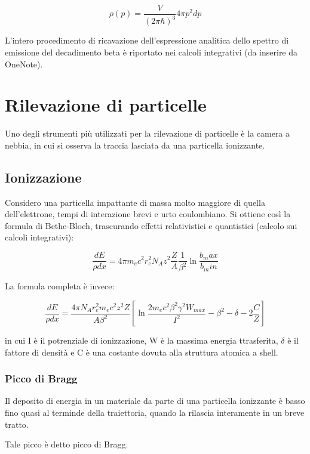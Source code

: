 \documentclass{article}
\begin{document}
\begin{equation}
    \rho(p)=\frac{V}{(2\pi\hbar)^3}4\pi p^2dp
\end{equation}

L'intero procedimento di ricavazione dell'espressione analitica dello spettro di emissione del decadimento beta è riportato nei calcoli integrativi (da inserire da OneNote).

\section{Rilevazione di particelle}
Uno degli strumenti più utilizzati per la rilevazione di particelle è la camera a nebbia, in cui si osserva la traccia lasciata da una particella ionizzante.

\subsection{Ionizzazione}
Considero una particella impattante di massa molto maggiore di quella dell'elettrone, tempi di interazione brevi e urto coulombiano.
Si ottiene così la formula di Bethe-Bloch, trascurando effetti relativistici e quantistici (calcolo sui calcoli integrativi):

\begin{equation}
    \frac{dE}{\rho dx}=4\pi m_ec^2r_e^2N_Az^2\frac{Z}{A}\frac{1}{\beta^2}\ln{\frac{b_max}{b_min}}
\end{equation}

La formula completa è invece:

\begin{equation}
    \frac{dE}{\rho dx}=\frac{4\pi N_Ar_e^2m_ec^2z^2Z}{A\beta^2}\left[\ln{\frac{2m_ec^2\beta^2\gamma^2W_{max}}{I^2}}-\beta^2-\delta -2\frac{C}{Z}\right]
\end{equation}

in cui I è il potrenziale di ionizzazione, W è la massima energia ttrasferita, $\delta$ è il fattore di densità e C è una costante dovuta alla struttura atomica a shell.

\subsubsection{Picco di Bragg}
Il deposito di energia in un materiale da parte di una particella ionizzante è basso fino quasi al terminde della traiettoria, quando la rilascia interamente in un breve tratto.

Tale picco è detto picco di Bragg.
\end{document}
